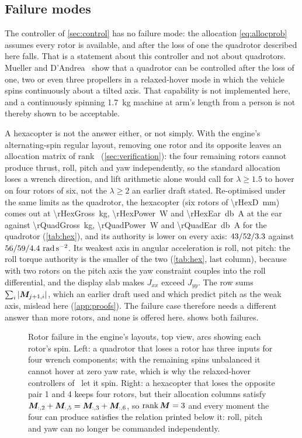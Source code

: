 \subsection{Failure modes}

The controller of \cref{sec:control} has no failure mode: the allocation
\cref{eq:allocprob} assumes every rotor is available, and after the loss of one
the quadrotor described here falls. That is a statement about this controller
and not about quadrotors. Mueller and D'Andrea~\cite{mueller2014} show that a
quadrotor can be controlled after the loss of one, two or even three
propellers in a relaxed-hover mode in which the vehicle spins continuously
about a tilted axis. That capability is not implemented here, and a
continuously spinning \SI{1.7}{\kilo\gram} machine at arm's length from a
person is not thereby shown to be acceptable.

A hexacopter is not the answer either, or not simply. With the engine's
alternating-spin regular layout, removing one rotor and its opposite leaves an
allocation matrix of rank \rHexRank\ (\cref{sec:verification}): the four
remaining rotors cannot produce thrust, roll, pitch and yaw independently, so
the standard allocation loses a wrench direction, and lift arithmetic alone
would call for $\lambda\ge1.5$ to hover on four rotors of six, not the
$\lambda\ge2$ an earlier draft stated. Re-optimised under the same limits as
the quadrotor, the hexacopter (six rotors of \SI{\rHexD}{\milli\metre}) comes
out at \SI{\rHexGross}{\kilo\gram}, \SI{\rHexPower}{\watt} and
\SI{\rHexEar}{\decibel A} at the ear against \SI{\rQuadGross}{\kilo\gram},
\SI{\rQuadPower}{\watt} and \SI{\rQuadEar}{\decibel A} for the quadrotor
(\cref{tab:hex}), and its authority is lower on every axis:
$43/52/3.3$ against
$\rQuadRoll/\rQuadPitch/\rQuadYaw\ \si{\radian\per\second\squared}$. Its
weakest axis in angular acceleration is roll, not pitch: the roll torque
authority is the smaller of the two (\cref{tab:hex}, last column), because
with two rotors on the pitch axis the yaw constraint couples into the roll
differential, and the display slab makes $J_{xx}$ exceed $J_{yy}$. The row sums
$\sum_i|\bm{M}_{j+1,i}|$, which an earlier draft used and which predict pitch
as the weak axis, mislead here (\cref{app:proofs}). The failure case therefore
needs a different answer than more rotors, and none is offered here.
 shows both failures.

\begin{figure}[tbp]
\centering

\caption{Rotor failure in the engine's layouts, top view, arcs showing each
rotor's spin. Left: a quadrotor that loses a rotor has three inputs for four
wrench components; with the remaining spins unbalanced it cannot hover at
zero yaw rate, which is why the relaxed-hover controllers of~\cite{mueller2014}
let it spin. Right: a hexacopter that loses the opposite pair 1 and 4 keeps
four rotors, but their allocation columns satisfy
$\bm{M}_{:,2}+\bm{M}_{:,5}=\bm{M}_{:,3}+\bm{M}_{:,6}$, so $\operatorname{rank}\bm{M}=3$ and
every moment the four can produce satisfies the relation printed below it:
roll, pitch and yaw can no longer be commanded independently.}
\label{fig:hexfail}
\end{figure}

